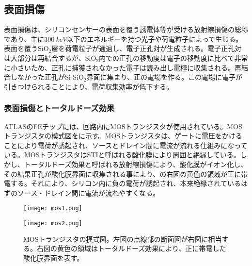 \subsection{表面損傷}
\label{sec:hyoumen}
表面損傷は、シリコンセンサーの表面を覆う誘電体等が受ける放射線損傷の総称であり、主に$300\ \si{keV}$以下のエネルギーを持つ光子や荷電粒子によって生じる。表面を覆うSiO$_2$層を荷電粒子が通過し、電子正孔対が生成される。電子正孔対は大部分は再結合するが、SiO$_2$内での正孔の移動度は電子の移動度に比べて非常に小さいため、正孔に捕獲されなかった電子は読み出し電極に収集される。再結合しなかった正孔がSi-SiO$_2$界面に集まり、正の電場を作る。この電場に電子が引きつけられることにより、電荷収集効率が低下する。


\subsubsection{表面損傷とトータルドーズ効果}
\label{sec:totaldoze}

ATLASのFEチップには、回路内にMOSトランジスタが使用されている。MOSトランジスタの模式図をに示す。MOSトランジスタは、ゲートに電圧をかけることにより電荷が誘起され、ソースとドレイン間に電流が流れる仕組みになっている。MOSトランジスタはSTIと呼ばれる酸化膜により周囲と絶縁している。しかし、トータルドーズ効果と呼ばれる放射線損傷により、酸化膜がイオン化し、その結果正孔が酸化膜界面に収集される事により、の右図の黄色の領域が正に帯電する。それにより、シリコン内に負の電荷が誘起され、本来絶縁されているはずのソース・ドレイン間に電流が流れやすくなる。

\begin{figure}[tbp]
  \begin{minipage}[b]{0.5\linewidth}
    \centering
    \texttt{[image: mos1.png]}
  \end{minipage}
  \begin{minipage}[b]{0.5\linewidth}
    \centering
    \texttt{[image: mos2.png]}
  \end{minipage}
  \caption[MOSトランジスタの模式図]{MOSトランジスタの模式図。左図の点線部の断面図が右図に相当する。右図の黄色の領域はトータルドーズ効果により、正に帯電した酸化膜界面を表す。}
  \label{fig:mos}
\end{figure}

